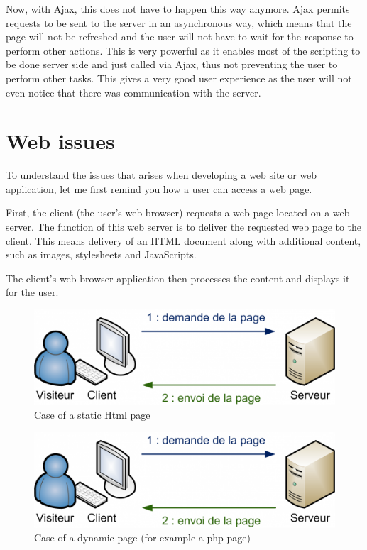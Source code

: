 Now, with Ajax, this does not have to happen this way anymore. Ajax permits requests to be sent to the server in an asynchronous way, which means that the page will not be refreshed and the user will not have to wait for the response to perform other actions. This is very powerful as it enables most of the scripting to be done server side and just called via Ajax, thus not preventing the user to perform other tasks. This gives a very good user experience as the user will not even notice that there was communication with the server.

\section{Web issues}

To understand the issues that arises when developing a web site or web application, let me first remind you how a user can access a web page.
\begin{itemize*}
\item First, the client (the user's web browser) requests a web page located on a web server. The function of this web server is to deliver the requested web page to the client. This means delivery of an HTML document along with additional content, 
such as images, stylesheets and JavaScripts.
\item The client's web browser application then processes the content and displays it for the user.  
\end{itemize*}

\begin{figure}[!ht]
\centering
\includegraphics[width=.55\textwidth]{img/static.png}
\caption{Case of a static Html page}
\label{figure:static-page}
\end{figure}

\begin{figure}[!ht]
\centering
\includegraphics[width=.55\textwidth]{img/static.png}
\caption{Case of a dynamic page (for example a php page)}
\label{figure:dynamic-page}
\end{figure}

